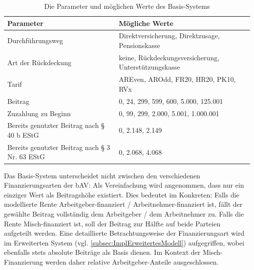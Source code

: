 \begin{table}[htb!]
\footnotesize
\begin{tabularx}{\textwidth}{|X|l|}
\hline
\cellcolor{grauinfo}Parameter                                      & \cellcolor{grauinfo}Mögliche Werte                                       \\ \hline
Durchführungsweg                               & Direktversicherung, Direktzusage, Pensionskasse      \\ \hline
Art der Rückdeckung\footnotemark               & keine, Rückdeckungsversicherung, Unterstützungskasse \\ \hline
Tarif                                          & AREven, AROdd, FR20, HR20, PK10, RVx                 \\ \hline
Beitrag                                        & 0, 24, 299, 599, 600, 5.000, 125.001                 \\ \hline
Zuzahlung zu Beginn                            & 0, 99, 299, 2.000, 5.001, 1.000.001                  \\ \hline
Bereits genutzter Beitrag nach § 40 b EStG     & 0, 2.148, 2.149                                      \\ \hline
Bereits genutzter Beitrag nach § 3 Nr. 63 EStG & 0, 2.068, 4.068                                      \\ \hline
\end{tabularx}
\normalsize
\caption{Die Parameter und möglichen Werte des Basis-Systems}
\label{tab:sutSimple}
\end{table}

Das Basis-System unterscheidet nicht zwischen den verschiedenen Finanzierungsarten der bAV: Als Vereinfachung wird angenommen, dass nur ein einziger Wert als Beitragshöhe existiert. Dies bedeutet im Konkreten: Falls die modellierte Rente Arbeitgeber-finanziert / Arbeitnehmer-finanziert ist, fällt der gewählte Beitrag vollständig dem Arbeitgeber / dem Arbeitnehmer zu. Falls die Rente Misch-finanziert ist, soll der Beitrag zur Hälfte auf beide Parteien aufgeteilt werden. Eine detaillierte Betrachtungsweise der Finanzierungsart wird im Erweiterten System (vgl. \autoref{subsec:ImplErweitertesModell}) aufgegriffen, wobei ebenfalls stets absolute Beiträge als Basis dienen. Im Kontext der Misch-Finanzierung werden daher relative Arbeitgeber-Anteile ausgeschlossen.

